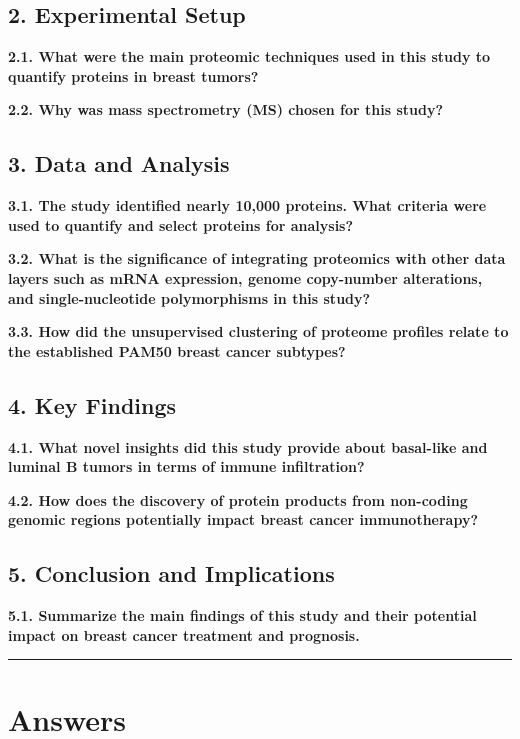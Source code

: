 \documentclass[
  letterpaper,
  DIV=11,
  numbers=noendperiod]{scrartcl}
\begin{document}
\subsection{2. Experimental Setup}\label{experimental-setup}

\textbf{2.1. What were the main proteomic techniques used in this study
to quantify proteins in breast tumors?}

\textbf{2.2. Why was mass spectrometry (MS) chosen for this study?}

\subsection{3. Data and Analysis}\label{data-and-analysis}

\textbf{3.1. The study identified nearly 10,000 proteins. What criteria
were used to quantify and select proteins for analysis?}

\textbf{3.2. What is the significance of integrating proteomics with
other data layers such as mRNA expression, genome copy-number
alterations, and single-nucleotide polymorphisms in this study?}

\textbf{3.3. How did the unsupervised clustering of proteome profiles
relate to the established PAM50 breast cancer subtypes?}

\subsection{4. Key Findings}\label{key-findings}

\textbf{4.1. What novel insights did this study provide about basal-like
and luminal B tumors in terms of immune infiltration?}

\textbf{4.2. How does the discovery of protein products from non-coding
genomic regions potentially impact breast cancer immunotherapy?}

\subsection{5. Conclusion and
Implications}\label{conclusion-and-implications}

\textbf{5.1. Summarize the main findings of this study and their
potential impact on breast cancer treatment and prognosis.}

\begin{center}\rule{0.5\linewidth}{0.5pt}\end{center}

\section{Answers}\label{answers}
\end{document}
